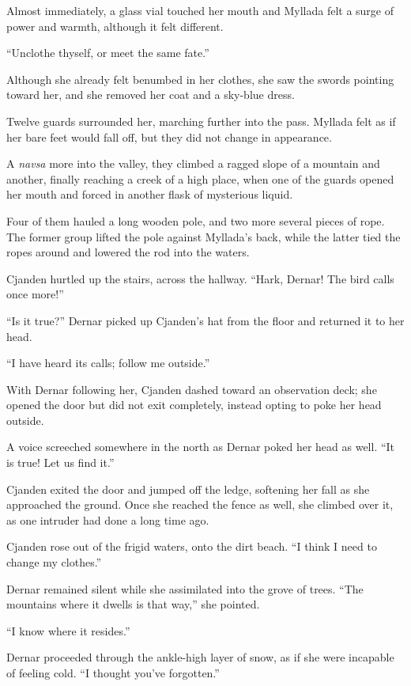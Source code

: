 Almost immediately, a glass vial touched her mouth and Myllada felt a surge of power and warmth, although it felt different.

``Unclothe thyself, or meet the same fate.''

Although she already felt benumbed in her clothes, she saw the swords pointing toward her, and she removed her coat and a sky-blue dress.

Twelve guards surrounded her, marching further into the pass. Myllada felt as if her bare feet would fall off, but they did not change in appearance.

A \emph{navsa} more into the valley, they climbed a ragged slope of a mountain and another, finally reaching a creek of a high place, when one of the guards opened her mouth and forced in another flask of mysterious liquid.

Four of them hauled a long wooden pole, and two more several pieces of rope. The former group lifted the pole against Myllada's back, while the latter tied the ropes around and lowered the rod into the waters.

\centeredstars

Cjanden hurtled up the stairs, across the hallway. ``Hark, Dernar! The bird calls once more!''

``Is it true?'' Dernar picked up Cjanden's hat from the floor and returned it to her head.

``I have heard its calls; follow me outside.''

With Dernar following her, Cjanden dashed toward an observation deck; she opened the door but did not exit completely, instead opting to poke her head outside.

A voice screeched somewhere in the north as Dernar poked her head as well. ``It is true! Let us find it.''

Cjanden exited the door and jumped off the ledge, softening her fall as she approached the ground. Once she reached the fence as well, she climbed over it, as one intruder had done a long time ago.

\centeredstars

Cjanden rose out of the frigid waters, onto the dirt beach. ``I think I need to change my clothes.''

Dernar remained silent while she assimilated into the grove of trees. ``The mountains where it dwells is that way,'' she pointed.

``I know where it resides.''

Dernar proceeded through the ankle-high layer of snow, as if she were incapable of feeling cold. ``I thought you've forgotten.''


